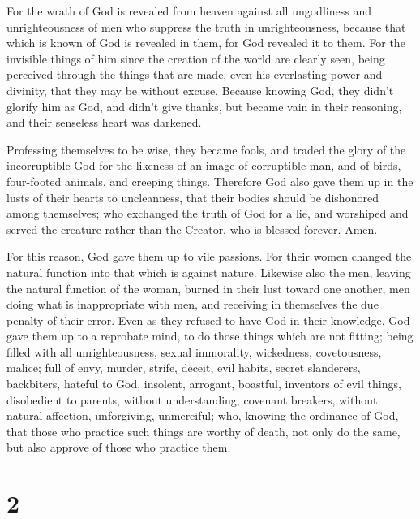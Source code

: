  For the wrath of God is revealed from heaven against all
ungodliness and unrighteousness of men who suppress the truth in
unrighteousness,  because that which is known of God is
revealed in them, for God revealed it to them.  For the
invisible things of him since the creation of the world are clearly
seen, being perceived through the things that are made, even his
everlasting power and divinity, that they may be without excuse.
 Because knowing God, they didn't glorify him as God, and
didn't give thanks, but became vain in their reasoning, and their
senseless heart was darkened.

 Professing themselves to be wise, they became fools,
 and traded the glory of the incorruptible God for the
likeness of an image of corruptible man, and of birds, four-footed
animals, and creeping things.  Therefore God also gave
them up in the lusts of their hearts to uncleanness, that their bodies
should be dishonored among themselves;  who exchanged the
truth of God for a lie, and worshiped and served the creature rather
than the Creator, who is blessed forever. Amen.

 For this reason, God gave them up to vile passions. For
their women changed the natural function into that which is against
nature.  Likewise also the men, leaving the natural
function of the woman, burned in their lust toward one another, men
doing what is inappropriate with men, and receiving in themselves the
due penalty of their error.  Even as they refused to have
God in their knowledge, God gave them up to a reprobate mind, to do
those things which are not fitting;  being filled with
all unrighteousness, sexual immorality, wickedness, covetousness,
malice; full of envy, murder, strife, deceit, evil habits, secret
slanderers,  backbiters, hateful to God, insolent,
arrogant, boastful, inventors of evil things, disobedient to parents,
 without understanding, covenant breakers, without
natural affection, unforgiving, unmerciful;  who, knowing
the ordinance of God, that those who practice such things are worthy of
death, not only do the same, but also approve of those who practice
them.

\hypertarget{section-1}{%
\section{2}\label{section-1}}

